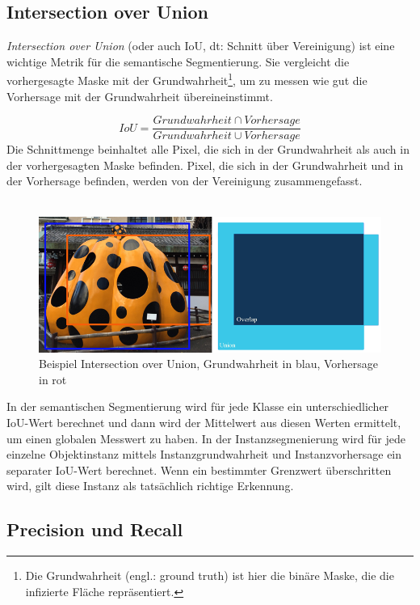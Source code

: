 \subsection{Intersection over Union}

\textit{Intersection over Union} (oder auch IoU, dt: Schnitt über Vereinigung) ist eine wichtige Metrik für die semantische Segmentierung. Sie vergleicht die vorhergesagte Maske mit der Grundwahrheit\footnote{Die Grundwahrheit (engl.: ground truth) ist hier die binäre Maske, die die infizierte Fläche repräsentiert.}, um zu messen wie gut die Vorhersage mit der Grundwahrheit übereineinstimmt.\cite{ref:map}

\begin{equation}\label{equation:recall}
  IoU = \frac{Grundwahrheit\cap Vorhersage}{Grundwahrheit\cup Vorhersage}
\end{equation}
\noindent
Die Schnittmenge beinhaltet alle Pixel, die sich in der Grundwahrheit als auch in der vorhergesagten Maske befinden. Pixel, die sich in der Grundwahrheit und in der Vorhersage befinden, werden von der Vereinigung zusammengefasst. 
\\\\
\begin{figure}[ht]
  \centering
  \includegraphics[width=\textwidth]{pics/iou.PNG}
  \caption[IoU]{Beispiel Intersection over Union, Grundwahrheit in blau, Vorhersage in rot\cite{ref:map}}
  \label{fig:iou}
\end{figure}
\noindent
In der semantischen Segmentierung wird für jede Klasse ein unterschiedlicher IoU-Wert berechnet und dann wird der Mittelwert aus diesen Werten ermittelt, um einen globalen Messwert zu haben. In der Instanzsegmenierung wird für jede einzelne Objektinstanz mittels Instanzgrundwahrheit und Instanzvorhersage ein separater IoU-Wert berechnet. Wenn ein bestimmter Grenzwert überschritten wird, gilt diese Instanz als tatsächlich richtige Erkennung.\cite{ref:jordan}

\subsection{Precision und Recall}

